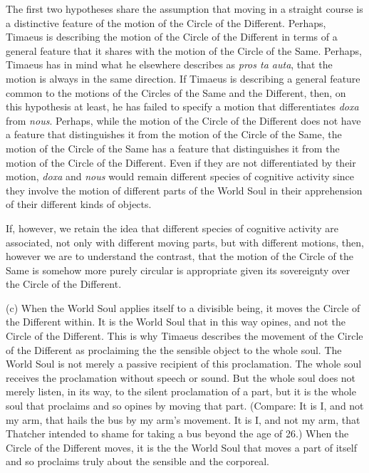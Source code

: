 The first two hypotheses share the assumption that moving in a straight course is a distinctive feature of the motion of the Circle of the Different. Perhaps, Timaeus is describing the motion of the Circle of the Different in terms of a general feature that it shares with the motion of the Circle of the Same. Perhaps, Timaeus has in mind what he elsewhere describes as \emph{pros ta auta}, that the motion is always in the same direction. If Timaeus is describing a general feature common to the motions of the Circles of the Same and the Different, then, on this hypothesis at least, he has failed to specify a motion that differentiates \emph{doxa} from \emph{nous}. Perhaps, while the motion of the Circle of the Different does not have a feature that distinguishes it from the motion of the Circle of the Same, the motion of the Circle of the Same has a feature that distinguishes it from the motion of the Circle of the Different. Even if they are not differentiated by their motion, \emph{doxa} and \emph{nous} would remain different species of cognitive activity since they involve the motion of different parts of the World Soul in their apprehension of their different kinds of objects.

If, however, we retain the idea that different species of cognitive activity are associated, not only with different moving parts, but with different motions, then, however we are to understand the contrast, that the motion of the Circle of the Same is somehow more purely circular is appropriate given its sovereignty over the Circle of the Different.

(c) When the World Soul applies itself to a divisible being, it moves the Circle of the Different within. It is the World Soul that in this way opines, and not the Circle of the Different. This is why Timaeus describes the movement of the Circle of the Different as proclaiming the the sensible object to the whole soul. The World Soul is not merely a passive recipient of this proclamation. The whole soul receives the proclamation without speech or sound. But the whole soul does not merely listen, in its way, to the silent proclamation of a part, but it is the whole soul that proclaims and so opines by moving that part. (Compare: It is I, and not my arm, that hails the bus by my arm's movement. It is I, and not my arm, that Thatcher intended to shame for taking a bus beyond the age of 26.) When the Circle of the Different moves, it is the the World Soul that moves a part of itself and so proclaims truly about the sensible and the corporeal. 

